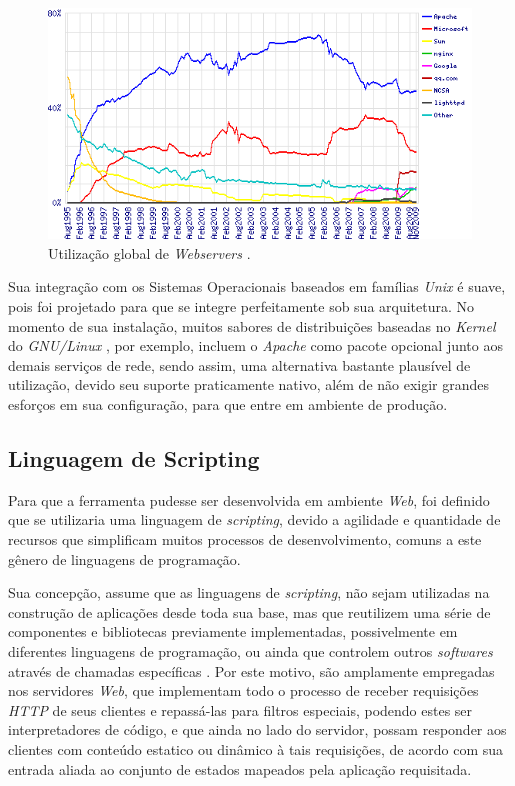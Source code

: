 \begin{figure}[H]
    \begin{center}
        \includegraphics[scale=0.8]{./figuras/overallc.png}

        \caption{\label{figura:utilizacao_webservers}Utilização global de \textit{Webservers} \cite{Netcraft}.}
    \end{center}
\end{figure}

Sua integração com os Sistemas Operacionais baseados em famílias \textit{Unix} é suave, pois foi projetado para que se integre perfeitamente sob sua arquitetura. No momento de sua instalação, muitos sabores de distribuições baseadas no \textit{Kernel} do \textit{GNU/Linux} \cite{LinuxKernel}, por exemplo, incluem o \textit{Apache} como pacote opcional junto aos demais serviços de rede, sendo assim, uma alternativa bastante plausível de utilização, devido seu suporte praticamente nativo, além de não exigir grandes esforços em sua configuração, para que entre em ambiente de produção.

\subsection{Linguagem de Scripting}

Para que a ferramenta pudesse ser desenvolvida em ambiente \textit{Web}, foi definido que se utilizaria uma linguagem de \textit{scripting}, devido a agilidade e quantidade de recursos que simplificam muitos processos de desenvolvimento, comuns a este gênero de linguagens de programação.

Sua concepção, assume que as linguagens de \textit{scripting}, não sejam utilizadas na construção de aplicações desde toda sua base, mas que reutilizem uma série de componentes e bibliotecas previamente implementadas, possivelmente em diferentes linguagens de programação, ou ainda que controlem outros \textit{softwares} através de chamadas específicas \cite{Scripting}. Por este motivo, são amplamente empregadas nos servidores \textit{Web}, que implementam todo o processo de receber requisições \textit{HTTP} de seus clientes e repassá-las para filtros especiais, podendo estes ser interpretadores de código, e que ainda no lado do servidor, possam responder aos clientes com conteúdo estatico ou dinâmico à tais requisições, de acordo com sua entrada aliada ao conjunto de estados mapeados pela aplicação requisitada.

